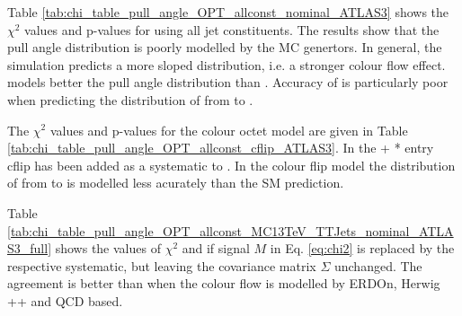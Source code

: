 Table \ref{tab:chi_table_pull_angle_OPT_allconst_nominal_ATLAS3} shows the $\chi^{2}$ values and p-values for \pullangle using all jet constituents. The results show that the pull angle distribution is poorly modelled by the MC genertors. In general, the simulation predicts a more sloped distribution, i.e. a stronger colour flow effect. \HERWIGpp models better the pull angle distribution than . Accuracy of  is particularly poor when predicting the distribution of \pullangle from \scndleadingjet to \leadingjet.

The $\chi^{2}$ values and p-values for the \PW colour octet model are given in Table \ref{tab:chi_table_pull_angle_OPT_allconst_cflip_ATLAS3}. In the \POWHEG+ * entry \ttbar cflip has been added as a systematic to \ttbar. In the colour flip model the distribution of \pullangle from \leadingjet to \scndleadingjet is modelled less acurately than the SM prediction.
  
Table \ref{tab:chi_table_pull_angle_OPT_allconst_MC13TeV_TTJets_nominal_ATLAS3_full} shows the values of $\chi^{2}$ and if signal $M$ in Eq. \ref{eq:chi2} is replaced by the respective systematic, but leaving the covariance matrix $\Sigma$ unchanged. The agreement is better than \ttbar when the colour flow is modelled by \ttbar ERDOn, \ttbar Herwig ++ and \ttbar QCD based.


















